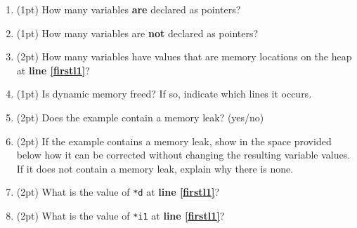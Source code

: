 \documentclass{article}
\newcommand*{\pts}[1]{\addtocounter{points}{#1}(#1pt)}
\begin{document}
\begin{spacing}{1.4}
\begin{enumerate}[leftmargin=*]
\newpage

\hspace{-.5cm}\textbf{Questions \ref{sl1}-\ref{el1}} refer to the code shown below. 

\begin{lstlisting}[showspaces=false,showlines=true,escapeinside={*@}{@*}]
int i, *i1;
double* d = new double[5];
double* d2 = new double[10];
i = 0;
i1 = &i;
while (i < 5) {
  d[i] = i;
  *(d2 + (i * 2)) = i;
  i = i + 2;
}
*@\label{firstl1}@*
delete [] d;

\end{lstlisting}


\item\label{sl1} \pts{1} How many variables \textbf{are} declared as
pointers? \underline{\hspace{1in}}

\item \pts{1} How many variables are \textbf{not} declared as
pointers? \underline{\hspace{1in}}

\item \pts{2} How many variables have values that are memory locations
on the heap at \textbf{line \ref{firstl1}}? \underline{\hspace{1in}}

\item \pts{1} Is dynamic memory freed? If so, indicate which lines it
occurs. \underline{\hspace{1in}}

\item \pts{2} Does the example contain a memory leak? (yes/no)
\underline{\hspace{1in}}

\item \pts{2} If the example contains a memory leak, show in the space
  provided below how it can be corrected without changing the
  resulting variable values. If it does not contain a memory leak,
  explain why there is none.

\vspace{2cm}

\item \pts{2} What is the value of \lstinline$*d$ at \textbf{line
  \ref{firstl1}}? \underline{\hspace{1in}}

\item \pts{2} What is the value of \lstinline$*i1$ at \textbf{line
  \ref{firstl1}}? \underline{\hspace{1in}}


\end{enumerate}
\end{spacing}
\end{document}
